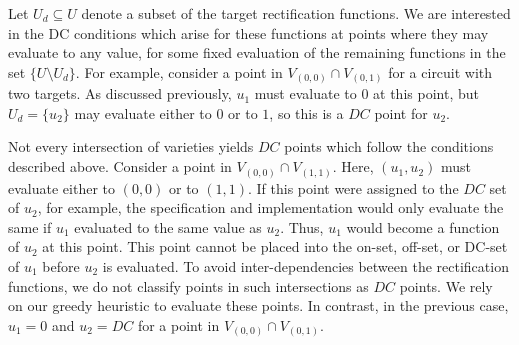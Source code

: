 
%

Let $U_d \subseteq U$ denote a subset of the target rectification functions. 
We are interested in the DC conditions which arise for these functions at 
points where they may evaluate to any value, for some fixed 
evaluation of the remaining functions in the set $\{U \setminus U_d\}$. 
For example, consider a point in $V_{(0,0)} \cap V_{(0,1)}$ for 
a circuit with two targets. As discussed previously, $u_1$ must evaluate to $0$ at 
this point, but $U_d = \{u_2\}$ may evaluate either to $0$ or to $1$,
so this is a $DC$ point for $u_2$. 


Not every intersection of varieties yields $DC$ points 
which follow the conditions described above. 
Consider a point in $V_{(0,0)} \cap V_{(1,1)}$. Here, $(u_1, u_2)$ 
must evaluate either to $(0,0)$ or to $(1,1)$. If this point were 
assigned to the $DC$ set of $u_2$, for example, the specification and implementation 
would only evaluate the same if $u_1$ evaluated to the same value as $u_2$.  
Thus, $u_1$ would become a function of $u_2$ at this point. This point 
cannot be placed into the on-set, off-set, or DC-set of $u_1$ before $u_2$ 
is evaluated. To avoid inter-dependencies between the rectification functions, we do not classify 
points in such intersections as $DC$ points. We rely on our greedy heuristic to 
evaluate these points. 
In contrast, in the previous 
case, $u_1 = 0$ and $u_2 = DC$ for a point in $V_{(0,0)} \cap V_{(0,1)}$. 

